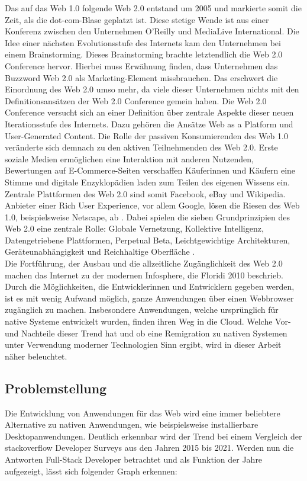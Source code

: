 \documentclass[a4paper]{scrartcl}
\begin{document}
Das auf das Web 1.0 folgende Web 2.0 entstand um 2005 und markierte somit die Zeit, als die dot-com-Blase geplatzt ist. Diese stetige Wende ist aus einer Konferenz zwischen den Unternehmen O'Reilly und MediaLive International. Die Idee einer nächsten Evolutionsstufe des Internets kam den Unternehmen bei einem Brainstorming. Dieses Brainstorming brachte letztendlich die Web 2.0 Conference hervor. Hierbei muss Erwähnung finden, dass Unternehmen das Buzzword Web 2.0 als Marketing-Element missbrauchen. Das erschwert die Einordnung des Web 2.0 umso mehr, da viele dieser Unternehmen nichts mit den Definitionsansätzen der Web 2.0 Conference gemein haben. Die Web 2.0 Conference versucht sich an einer Definition über zentrale Aspekte dieser neuen Iterationsstufe des Internets. Dazu gehören die Ansätze Web as a Platform und User-Generated Content. Die Rolle der passiven Konsumierenden des Web 1.0 veränderte sich demnach zu den aktiven Teilnehmenden des Web 2.0. Erste soziale Medien ermöglichen eine Interaktion mit anderen Nutzenden, Bewertungen auf E-Commerce-Seiten verschaffen Käuferinnen und Käufern eine Stimme und digitale Enzyklopädien laden zum Teilen des eigenen Wissens ein. Zentrale Plattformen des Web 2.0 sind somit Facebook, eBay und Wikipedia. Anbieter einer Rich User Experience, vor allem Google, lösen die Riesen des Web 1.0, beispielsweise Netscape, ab \autocite{Oreilly}. Dabei spielen die sieben Grundprinzipien des Web 2.0 eine zentrale Rolle: Globale Vernetzung, Kollektive Intelligenz, Datengetriebene Plattformen, Perpetual Beta, Leichtgewichtige Architekturen, Geräteunabhängigkeit und Reichhaltige Oberfläche \autocite[Kollmann und Häsel 2007, zitiert nach][137]{Kollmann}. \\

Die Fortführung, der Ausbau und die allzeitliche Zugänglichkeit des Web 2.0 machen das Internet zu der modernen Infosphere, die Floridi 2010 beschrieb. Durch die Möglichkeiten, die Entwicklerinnen und Entwicklern gegeben werden, ist es mit wenig Aufwand möglich, ganze Anwendungen über einen Webbrowser zugänglich zu machen. Insbesondere Anwendungen, welche ursprünglich für native Systeme entwickelt wurden, finden ihren Weg in die Cloud. Welche Vor- und Nachteile dieser Trend hat und ob eine Remigration zu nativen Systemen unter Verwendung moderner Technologien Sinn ergibt, wird in dieser Arbeit näher beleuchtet. 

\newpage

\subsection{Problemstellung}
Die Entwicklung von Anwendungen für das Web wird eine immer beliebtere Alternative zu nativen Anwendungen, wie beispielsweise installierbare Desktopanwendungen. Deutlich erkennbar wird der Trend bei einem Vergleich der stackoverflow Developer Surveys aus den Jahren 2015 bis 2021. Werden nun die Antworten Full-Stack Developer betrachtet und als Funktion der Jahre aufgezeigt, lässt sich folgender Graph erkennen: 
\end{document}
